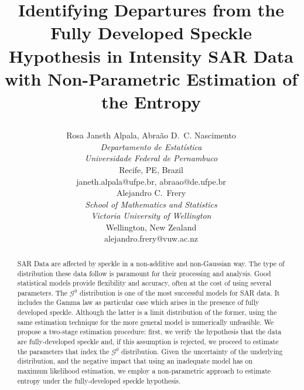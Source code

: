 \documentclass[conference]{IEEEtran}
\begin{document}
\title{Identifying Departures from the Fully Developed Speckle Hypothesis in Intensity SAR Data with Non-Parametric Estimation of the Entropy\\



\author{
\begin{minipage}[t]{0.5\textwidth}
\centering
Rosa Janeth Alpala, Abraão D.\ C. Nascimento \\
\textit{Departamento de Estatística} \\
\textit{Universidade Federal de Pernambuco}\\
Recife, PE, Brazil\\
janeth.alpala@ufpe.br, abraao@de.ufpe.br 
\end{minipage}%
\begin{minipage}[t]{0.4\textwidth}
\centering
Alejandro C.\ Frery\\
\textit{School of Mathematics and Statistics} \\
\textit{Victoria University of Wellington}\\
Wellington, New Zealand\\
alejandro.frery@vuw.ac.nz
\end{minipage}
}

\maketitle\begin{abstract}
SAR Data are affected by speckle in a non-additive and non-Gaussian way.
The type of distribution these data follow is paramount for their processing and analysis.
Good statistical models provide flexibility and accuracy, often at the cost of using several parameters.
The $\mathcal{G}^0$ distribution is one of the most successful models for SAR data. 
It includes the Gamma law as particular case which arises in the presence of fully developed speckle.
Although the latter is a limit distribution of the former, using the same estimation technique for the more general model is numerically unfeasible.
We propose a two-stage estimation procedure: first, we verify the hypothesis that the data are fully-developed speckle and, if this assumption is rejected, we proceed to estimate the parameters that index the $\mathcal G^0$ distribution.
Given the uncertainty of the underlying distribution, and the negative impact that using an inadequate model has on maximum likelihood estimation, we employ a non-parametric approach to estimate entropy under the fully-developed speckle hypothesis.
\end{abstract}

}
\end{document}

